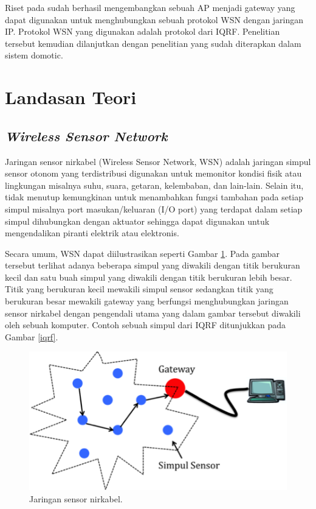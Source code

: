 \documentclass{jtetiproposalskripsi}
\begin{document}
Riset pada sudah berhasil mengembangkan sebuah AP menjadi gateway yang dapat digunakan untuk menghubungkan sebuah protokol WSN dengan jaringan IP. Protokol WSN yang digunakan adalah protokol dari IQRF. Penelitian tersebut kemudian dilanjutkan dengan penelitian yang sudah diterapkan dalam sistem domotic.

\section{Landasan Teori}
\subsection{\emph{Wireless Sensor Network}}
Jaringan sensor nirkabel (Wireless Sensor Network, WSN) adalah jaringan simpul sensor otonom yang terdistribusi digunakan untuk memonitor kondisi fisik atau lingkungan misalnya suhu, suara, getaran, kelembaban, dan lain-lain. Selain itu, tidak menutup kemungkinan untuk menambahkan fungsi tambahan pada setiap simpul misalnya port masukan/keluaran (I/O port) yang terdapat dalam setiap simpul dihubungkan dengan aktuator sehingga dapat digunakan untuk mengendalikan piranti elektrik atau elektronis.

Secara umum, WSN dapat diilustrasikan seperti Gambar \ref{wsn}. Pada gambar tersebut terlihat adanya beberapa simpul yang diwakili dengan titik berukuran kecil dan satu buah simpul yang diwakili dengan titik berukuran lebih besar. Titik yang berukuran kecil mewakili simpul sensor sedangkan titik yang berukuran besar mewakili gateway yang berfungsi menghubungkan jaringan sensor nirkabel dengan pengendali utama yang dalam gambar tersebut diwakili oleh sebuah komputer. Contoh sebuah simpul dari IQRF ditunjukkan pada Gambar \ref{iqrf}.

\begin{figure}[ht!]
  \centering
    \includegraphics{gambar/wsn}
    \caption{Jaringan sensor nirkabel.}
    \label{wsn}
\end{figure}
\end{document}
